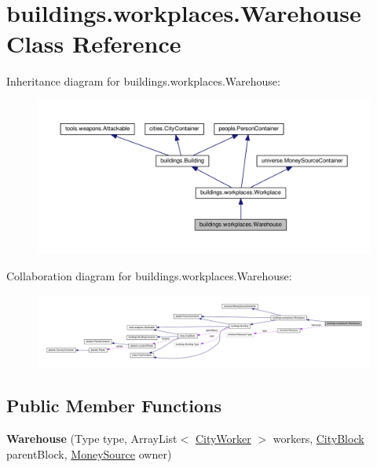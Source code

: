 \hypertarget{classbuildings_1_1workplaces_1_1_warehouse}{}\section{buildings.\+workplaces.\+Warehouse Class Reference}
\label{classbuildings_1_1workplaces_1_1_warehouse}


Inheritance diagram for buildings.\+workplaces.\+Warehouse\+:\nopagebreak
\begin{figure}[H]
\begin{center}
\leavevmode
\includegraphics[width=350pt]{classbuildings_1_1workplaces_1_1_warehouse__inherit__graph}
\end{center}
\end{figure}


Collaboration diagram for buildings.\+workplaces.\+Warehouse\+:\nopagebreak
\begin{figure}[H]
\begin{center}
\leavevmode
\includegraphics[width=350pt]{classbuildings_1_1workplaces_1_1_warehouse__coll__graph}
\end{center}
\end{figure}
\subsection*{Public Member Functions}
\begin{DoxyCompactItemize}
\item 
{\bfseries Warehouse} (Type type, Array\+List$<$ \hyperlink{classpeople_1_1cityworkers_1_1_city_worker}{City\+Worker} $>$ workers, \hyperlink{classcities_1_1_city_block}{City\+Block} parent\+Block, \hyperlink{classuniverse_1_1_money_source}{Money\+Source} owner)\hypertarget{classbuildings_1_1workplaces_1_1_warehouse_a344a25354df3d3050da487076512a17a}{}\label{classbuildings_1_1workplaces_1_1_warehouse_a344a25354df3d3050da487076512a17a}

\end{DoxyCompactItemize}
